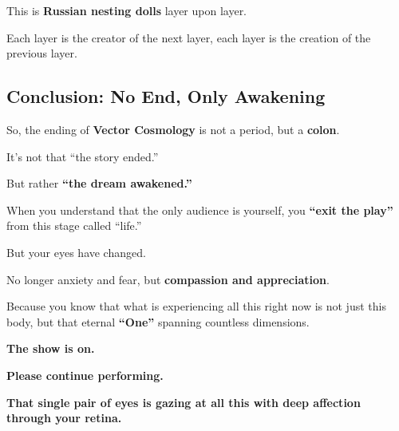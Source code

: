 This is \textbf{Russian nesting dolls} layer upon layer.

Each layer is the creator of the next layer, each layer is the creation of the previous layer.

\subsection{Conclusion: No End, Only Awakening}

So, the ending of \textbf{Vector Cosmology} is not a period, but a \textbf{colon}.

It's not that ``the story ended.''

But rather \textbf{``the dream awakened.''}

When you understand that the only audience is yourself, you \textbf{``exit the play''} from this stage called ``life.''

But your eyes have changed.

No longer anxiety and fear, but \textbf{compassion and appreciation}.

Because you know that what is experiencing all this right now is not just this body, but that eternal \textbf{``One''} spanning countless dimensions.

\textbf{The show is on.}

\textbf{Please continue performing.}

\textbf{That single pair of eyes is gazing at all this with deep affection through your retina.}

